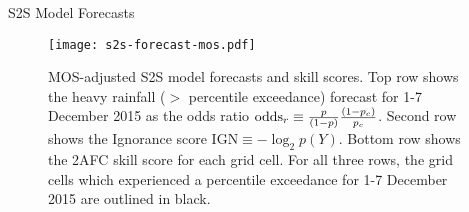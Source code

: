 \begin{block}{S2S  Model Forecasts}
  \begin{mdframed}
  \begin{figure}
  	\noindent\texttt{[image: s2s-forecast-mos.pdf]}
  	\caption{
    MOS-adjusted S2S model forecasts and skill scores.
    Top row shows the heavy rainfall ($>$ percentile exceedance) forecast for 1-7 December 2015 as the odds ratio $\text{odds}_{r} \equiv \frac{p}{\qty(1 - p)} \frac{\qty(1 - p_c)}{p_c}$.
    Second row shows the Ignorance score $\text{IGN} \equiv - \log_2 p(Y)$.
    Bottom row shows the 2AFC skill score for each grid cell.
    For all three rows, the grid cells which experienced a  percentile exceedance for 1-7 December 2015 are outlined in black.
        \label{fig:subs-prob-fcst}
  	}
  \end{figure}
  \end{mdframed}
\end{block}
